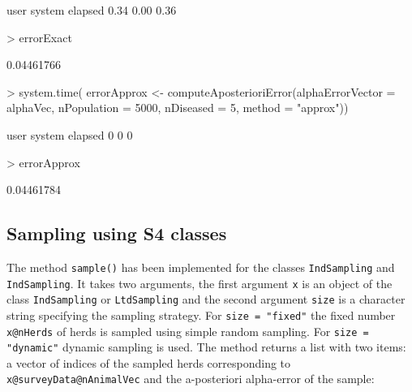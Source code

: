 \documentclass[nojss]{jss}
\begin{document}
\begin{Schunk}
\begin{Soutput}
   user  system elapsed 
   0.34    0.00    0.36 
\end{Soutput}
\begin{Sinput}
> errorExact    
\end{Sinput}
\begin{Soutput}
[1] 0.04461766
\end{Soutput}
\begin{Sinput}
> system.time({
   errorApprox <- computeAposterioriError(alphaErrorVector = alphaVec, 
       nPopulation = 5000, nDiseased = 5, method = "approx")})
\end{Sinput}
\begin{Soutput}
   user  system elapsed 
      0       0       0 
\end{Soutput}
\begin{Sinput}
> errorApprox
\end{Sinput}
\begin{Soutput}
[1] 0.04461784
\end{Soutput}
\end{Schunk}



\subsection{Sampling using S4 classes} 
\label{subsec:sampling_with_class}

The method \texttt{sample()} 
has been implemented for the classes \texttt{IndSampling} and 
\texttt{IndSampling}. It takes two arguments, the first argument 
\texttt{x} is an object of the class \texttt{IndSampling} or 
\texttt{LtdSampling} and the second argument \texttt{size} is a 
character string specifying the sampling strategy. For \texttt{size 
= "fixed"} the fixed number \texttt{x@nHerds} of herds is sampled 
using simple random sampling. For \texttt{size = "dynamic"} dynamic 
sampling is used. The method returns a list with two items: a vector 
of indices of the sampled herds corresponding to 
\texttt{x@surveyData@nAnimalVec} and the a-posteriori alpha-error of 
the sample:
\end{document}
